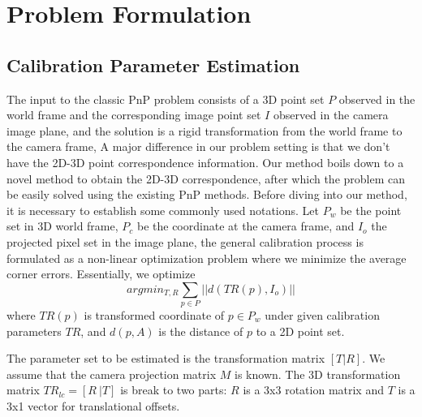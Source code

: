 \documentclass{article}
\begin{document}
\section{Problem Formulation}
\subsection{Calibration Parameter Estimation}
The input to the classic PnP problem consists of a 3D point set $P$ observed in the world frame and the corresponding image point set $I$ observed in the camera image plane, and the solution is a rigid transformation from the world frame to the camera frame, A major difference in our problem setting is that we don't have the 2D-3D point correspondence information. Our method boils down to a novel method to obtain the 2D-3D correspondence, after which the problem can be easily solved using the existing PnP methods.
Before diving into our method, it is necessary to establish some commonly used notations. Let $P_w$ be the point set in 3D world frame, $P_c $ be the coordinate at the camera frame, and $I_o$ the projected pixel set in the image plane, the general calibration process is formulated as a non-linear optimization problem where we minimize the average corner errors. Essentially, we optimize
\[ argmin_{T,R}{\sum_{p \in P}{||d(TR(p), I_o)||}}\] where $TR(p) $ is transformed coordinate of $p\in P_w$  under given calibration parameters $TR$, and $d(p, A)$ is the distance of $p$ to a 2D point set.

The parameter set to be estimated is the transformation matrix $[T | R]$. We assume that the camera projection matrix $M$ is known.        
The 3D transformation matrix $TR_{lc} = [R~| T]$ is break to two parts: $R$ is a 3x3 rotation matrix and $T$ is a 3x1 vector for translational offsets. 
\end{document}
